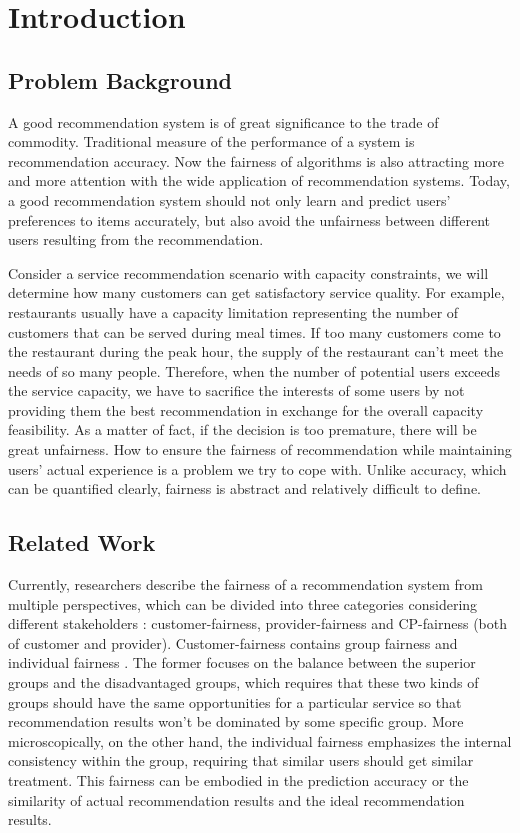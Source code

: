\section{Introduction}

\subsection{Problem Background}
A good recommendation system is of great significance to the trade of commodity. Traditional measure of the performance of a system is recommendation accuracy. Now the fairness of algorithms is also attracting more and more attention with the wide application of recommendation systems. Today, a good recommendation system should not only learn and predict users’ preferences to items accurately, but also avoid the unfairness between different users resulting from the recommendation. 

Consider a service recommendation scenario with capacity constraints, we will determine how many customers can get satisfactory service quality. For example, restaurants usually have a capacity limitation representing the number of customers that can be served during meal times. If too many customers come to the restaurant during the peak hour, the supply of the restaurant can't meet the needs of so many people. Therefore, when the number of potential users exceeds the service capacity, we have to sacrifice the interests of some users by not providing them the best recommendation in exchange for the overall capacity feasibility. As a matter of fact, if the decision is too premature, there will be great unfairness. How to ensure the fairness of recommendation while maintaining users’ actual experience is a problem we try to cope with. Unlike accuracy, which can be quantified clearly, fairness is abstract and relatively difficult to define. 

\subsection{Related Work}
Currently, researchers describe the fairness of a recommendation system from multiple perspectives, which can be divided into three categories considering different stakeholders \cite{Multisided}: customer-fairness, provider-fairness \cite{FER} and CP-fairness (both of customer and provider). Customer-fairness contains group fairness \cite{Group} and individual fairness \cite{Indi1}\cite{Indi2}. The former focuses on the balance between the superior groups and the disadvantaged groups, which requires that these two kinds of groups should have the same opportunities for a particular service so that recommendation results won’t be dominated by some specific group. More microscopically, on the other hand, the individual fairness emphasizes the internal consistency within the group, requiring that similar users should get similar treatment. This fairness can be embodied in the prediction accuracy or the similarity of actual recommendation results and the ideal recommendation results.





